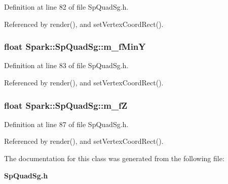 Definition at line 82 of file Sp\-Quad\-Sg.h.

Referenced by render(), and set\-Vertex\-Coord\-Rect().
\subsubsection{\setlength{\rightskip}{0pt plus 5cm}float {\bf Spark::Sp\-Quad\-Sg::m\_\-f\-Min\-Y}\hspace{0.3cm}{\tt  [protected]}}\label{classSpark_1_1SpQuadSg_p1}


Definition at line 83 of file Sp\-Quad\-Sg.h.

Referenced by render(), and set\-Vertex\-Coord\-Rect().
\subsubsection{\setlength{\rightskip}{0pt plus 5cm}float {\bf Spark::Sp\-Quad\-Sg::m\_\-f\-Z}\hspace{0.3cm}{\tt  [protected]}}\label{classSpark_1_1SpQuadSg_p4}


Definition at line 87 of file Sp\-Quad\-Sg.h.

Referenced by render(), and set\-Vertex\-Coord\-Rect().

The documentation for this class was generated from the following file:\begin{CompactItemize}
\item 
{\bf Sp\-Quad\-Sg.h}\end{CompactItemize}
